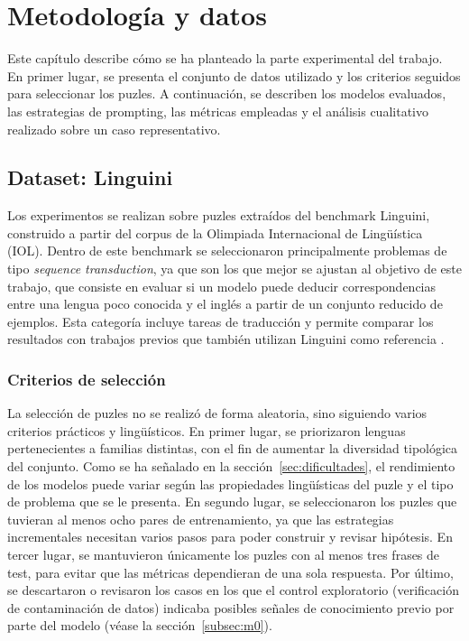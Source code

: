\chapter{Metodología y datos}
\label{cap:metodologia}

Este capítulo describe cómo se ha planteado la parte experimental del trabajo. En primer lugar, se presenta el conjunto de datos utilizado y los criterios seguidos para seleccionar los puzles. A continuación, se describen los modelos evaluados, las estrategias de prompting, las métricas empleadas y el análisis cualitativo realizado sobre un caso representativo.

\section{Dataset: Linguini}
\label{sec:dataset}

Los experimentos se realizan sobre puzles extraídos del benchmark Linguini, construido a partir del corpus de la Olimpiada Internacional de Lingüística (IOL). Dentro de este benchmark se seleccionaron principalmente problemas de tipo \textit{sequence transduction}, ya que son los que mejor se ajustan al objetivo de este trabajo, que consiste en evaluar si un modelo puede deducir correspondencias entre una lengua poco conocida y el inglés a partir de un conjunto reducido de ejemplos. Esta categoría incluye tareas de traducción y permite comparar los resultados con trabajos previos que también utilizan Linguini como referencia \citep{sanchez2024linguini,zhu2025evaluating}.

\subsection{Criterios de selección}

La selección de puzles no se realizó de forma aleatoria, sino siguiendo varios criterios prácticos y lingüísticos. En primer lugar, se priorizaron lenguas pertenecientes a familias distintas, con el fin de aumentar la diversidad tipológica del conjunto. Como se ha señalado en la sección~\ref{sec:dificultades}, el rendimiento de los modelos puede variar según las propiedades lingüísticas del puzle y el tipo de problema que se le presenta. En segundo lugar, se seleccionaron los puzles que tuvieran al menos ocho pares de entrenamiento, ya que las estrategias incrementales necesitan varios pasos para poder construir y revisar hipótesis. En tercer lugar, se mantuvieron únicamente los puzles con al menos tres frases de test, para evitar que las métricas dependieran de una sola respuesta. Por último, se descartaron o revisaron los casos en los que el control exploratorio (verificación de contaminación de datos) indicaba posibles señales de conocimiento previo por parte del modelo (véase la sección~\ref{subsec:m0}).


